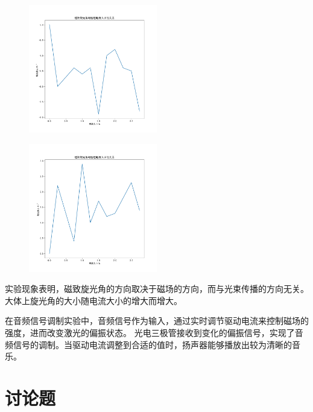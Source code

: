 \documentclass[signature=data]{physicsreport}
\begin{document}
\begin{figure}[H]
    \centering
    \includegraphics[width=0.5\textwidth]{./images/lab11/T3_2.png}
    
    \label{fig:magneto_optic_effect2}
\end{figure}

\begin{figure}[H]
    \centering
    \includegraphics[width=0.5\textwidth]{./images/lab11/T3_3.png}
    
    \label{fig:magneto_optic_effect3}
\end{figure}

实验现象表明，磁致旋光角的方向取决于磁场的方向，而与光束传播的方向无关。大体上旋光角的大小随电流大小的增大而增大。

在音频信号调制实验中，音频信号作为输入，通过实时调节驱动电流来控制磁场的强度，进而改变激光的偏振状态。
光电三极管接收到变化的偏振信号，实现了音频信号的调制。当驱动电流调整到合适的值时，扬声器能够播放出较为清晰的音乐。
\newpage



\section{讨论题}
\end{document}
